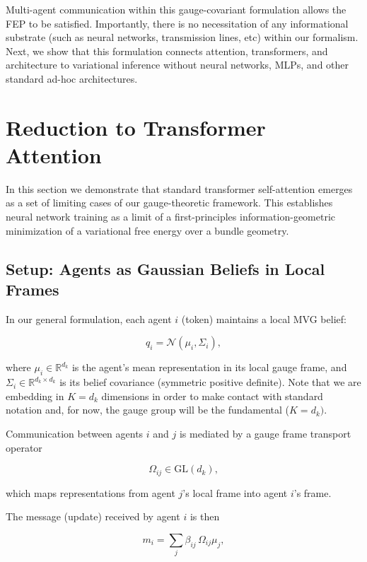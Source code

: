 \documentclass[twoside,11pt]{article}
\begin{document}
Multi-agent communication within this gauge-covariant formulation allows the FEP to be satisfied. Importantly, there is no necessitation of any informational substrate (such as neural networks, transmission lines, etc) within our formalism. Next, we show that this formulation connects attention, transformers, and architecture to variational inference without neural networks, MLPs, and other standard ad-hoc architectures.

\section{Reduction to Transformer Attention}

In this section we demonstrate that standard transformer self-attention emerges as a set of limiting cases of our gauge-theoretic framework. This establishes neural network training as a limit of a first-principles information-geometric minimization of a variational free energy over a bundle geometry.

\subsection{Setup: Agents as Gaussian Beliefs in Local Frames}

In our general formulation, each agent $i$ (token) maintains a local MVG belief:

\begin{equation}
q_i = \mathcal{N}(\mu_i, \Sigma_i),
\end{equation}

where $\mu_i \in \mathbb{R}^{d_k}$ is the agent's mean representation in its local gauge frame, and $\Sigma_i \in \mathbb{R}^{d_k\times d_k}$ is its belief covariance (symmetric positive definite). Note that we are embedding in $K=d_k$ dimensions in order to make contact with standard notation and, for now, the gauge group will be the fundamental ($K=d_k)$. 

Communication between agents $i$ and $j$ is mediated by a gauge frame transport operator

\begin{equation}
\Omega_{ij} \in \mathrm{GL}(d_k),
\end{equation}

which maps representations from agent $j$'s local frame into agent $i$'s frame. 

The message (update) received by agent $i$ is then

\begin{equation}
m_i = \sum_j \beta_{ij} \,\Omega_{ij}\mu_j,
\end{equation}
\end{document}
